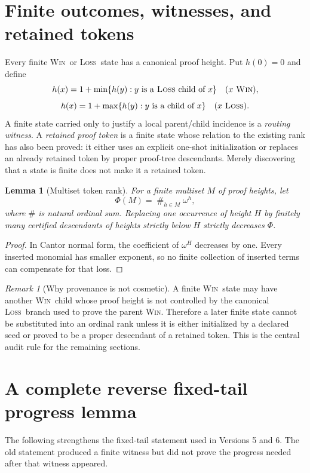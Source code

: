 \documentclass[11pt,a4paper]{article}
\newtheorem{lemma}[theorem]{Lemma}
\theoremstyle{definition}
\theoremstyle{remark}
\newtheorem{remark}[theorem]{Remark}
\newcommand{\WIN}{\textnormal{\textsc{Win}}}
\newcommand{\LOSS}{\textnormal{\textsc{Loss}}}
\begin{document}
\section{Finite outcomes, witnesses, and retained tokens}

Every finite \WIN\ or \LOSS\ state has a canonical proof height.  Put
$h(0)=0$ and define
\[
 h(x)=1+\min\{h(y):y\text{ is a \LOSS\ child of }x\}
 \quad(x\text{ \WIN}),
\]
\[
 h(x)=1+\max\{h(y):y\text{ is a child of }x\}
 \quad(x\text{ \LOSS}).
\]
A finite state carried only to justify a local parent/child incidence is a
\emph{routing witness}.  A \emph{retained proof token} is a finite state
whose relation to the existing rank has also been proved: it either uses an
explicit one-shot initialization or replaces an already retained token by
proper proof-tree descendants.  Merely discovering that a state is finite
does not make it a retained token.

\begin{lemma}[Multiset token rank]\label{lem:token-rank}
For a finite multiset $M$ of proof heights, let
\[
  \Phi(M)=\mathop{\#}_{h\in M}\omega^h,
\]
where $\#$ is natural ordinal sum.  Replacing one occurrence of height $H$
by finitely many certified descendants of heights strictly below $H$
strictly decreases $\Phi$.
\end{lemma}

\begin{proof}
In Cantor normal form, the coefficient of $\omega^H$ decreases by one.
Every inserted monomial has smaller exponent, so no finite collection of
inserted terms can compensate for that loss.
\end{proof}

\begin{remark}[Why provenance is not cosmetic]
A finite \WIN\ state may have another \WIN\ child whose proof height is
not controlled by the canonical \LOSS\ branch used to prove the parent
\WIN.  Therefore a later finite state cannot be substituted into an
ordinal rank unless it is either initialized by a declared seed or proved to
be a proper descendant of a retained token.  This is the central audit rule
for the remaining sections.
\end{remark}

\section{A complete reverse fixed-tail progress lemma}

The following strengthens the fixed-tail statement used in Versions 5 and
6.  The old statement produced a finite witness but did not prove the
progress needed after that witness appeared.
\end{document}
